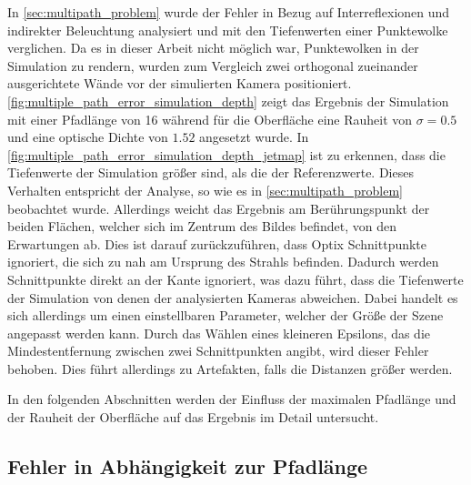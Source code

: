 \documentclass[thesis.tex]{subfiles}
\begin{document}
In \autoref{sec:multipath_problem} wurde der Fehler in Bezug auf Interreflexionen und indirekter Beleuchtung analysiert und mit den Tiefenwerten einer Punktewolke verglichen. Da es in dieser Arbeit nicht möglich war, Punktewolken in der Simulation zu rendern, wurden zum Vergleich zwei orthogonal zueinander ausgerichtete Wände vor der simulierten Kamera positioniert. \autoref{fig:multiple_path_error_simulation_depth} zeigt das Ergebnis der Simulation mit einer Pfadlänge von 16 während für die Oberfläche eine Rauheit von $\sigma = 0.5$ und eine optische Dichte von $1.52$ angesetzt wurde. In \autoref{fig:multiple_path_error_simulation_depth_jetmap} ist zu erkennen, dass die Tiefenwerte der Simulation größer sind, als die der Referenzwerte. Dieses Verhalten entspricht der Analyse, so wie es in \autoref{sec:multipath_problem} beobachtet wurde. Allerdings weicht das Ergebnis am Berührungspunkt der beiden Flächen, welcher sich im Zentrum des Bildes befindet, von den Erwartungen ab. Dies ist darauf zurückzuführen, dass Optix Schnittpunkte ignoriert, die sich zu nah am Ursprung des Strahls befinden. Dadurch werden Schnittpunkte direkt an der Kante ignoriert, was dazu führt, dass die Tiefenwerte der Simulation von denen der analysierten Kameras abweichen. Dabei handelt es sich allerdings um einen einstellbaren Parameter, welcher der Größe der Szene angepasst werden kann. Durch das Wählen eines kleineren Epsilons, das die Mindestentfernung zwischen zwei Schnittpunkten angibt, wird dieser Fehler behoben. Dies führt allerdings zu Artefakten, falls die Distanzen größer werden.

In den folgenden Abschnitten werden der Einfluss der maximalen Pfadlänge und der Rauheit der Oberfläche auf das Ergebnis im Detail untersucht.

\subsection{Fehler in Abhängigkeit zur Pfadlänge}\label{sec:eval_error_pathlength}
\end{document}
